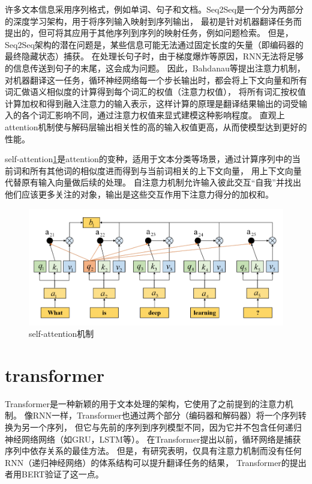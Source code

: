 许多文本信息采用序列格式，例如单词、句子和文档。Seq2Seq是一个分为两部分的深度学习架构，用于将序列输入映射到序列输出，
最初是针对机器翻译任务而提出的，但可将其应用于其他序列到序列的映射任务，例如问题检索。
但是，Seq2Seq架构的潜在问题是，某些信息可能无法通过固定长度的矢量（即编码器的最终隐藏状态）捕获。
在处理长句子时，由于梯度爆炸等原因，RNN无法将足够的信息传送到句子的末尾，这会成为问题。
因此，Bahdanau等\cite{bahdanau2014neural}提出注意力机制，对机器翻译这一任务，循环神经网络每一个步长输出时，都会将上下文向量和所有词汇做语义相似度的计算得到每个词汇的权值（注意力权值），
将所有词汇按权值计算加权和得到融入注意力的输入表示，这样计算的原理是翻译结果输出的词受输入的各个词汇影响不同，通过注意力权值来显式建模这种影响程度。
直观上attention机制使与解码层输出相关性的高的输入权值更高，从而使模型达到更好的性能。

self-attention\ref{fig:attent}是attention的变种，适用于文本分类等场景，通过计算序列中的当前词和所有其他词的相似度进而得到与当前词相关的上下文向量，
用上下文向量代替原有输入向量做后续的处理。
自注意力机制允许输入彼此交互“自我”并找出他们应该更多关注的对象，输出是这些交互作用下注意力得分的加权和。
\begin{figure}[htbp]
  \centering
  \includegraphics[width=13cm]{./images/attention.png}
  \caption{self-attention机制}
  \label{fig:attent}
\end{figure}

\section{transformer}
Transformer\cite{vaswani2017attention}是一种新颖的用于文本处理的架构，它使用了之前提到的注意力机制。
像RNN一样，Transformer也通过两个部分（编码器和解码器）将一个序列转换为另一个序列，
但它与先前的序列到序列模型不同，因为它并不包含任何递归神经网络网络（如GRU，LSTM等）。
在Transformer提出以前，循环网络是捕获序列中依存关系的最佳方法。 
但是，有研究表明，仅具有注意力机制而没有任何RNN（递归神经网络）的体系结构可以提升翻译任务的结果，
Transformer的提出者用BERT验证了这一点。

